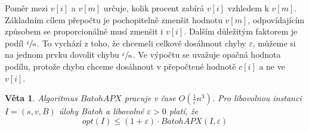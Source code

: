 \documentclass[11pt]{report} %
\newtheorem{theorem}{Věta}[section]
\numberwithin{equation}{section}
\begin{document}
Poměr mezi $v[i]$ a $v[m]$ určuje, kolik procent zabírá $v[i]$ vzhledem k $v[m]$. Základním cílem přepočtu je pochopitelně zmenšit hodnotu $v[m]$, odpovídajícím způsobem se proporcionálně musí zmenšit i $v[i]$. Dalším důležitým faktorem je podíl $\sfrac{\varepsilon}{n}$. To vychází z toho, že chcemeli celkově dosáhnout chyby $\varepsilon$, můžeme si na jednom prvku dovolit chybu $\sfrac{\varepsilon}{n}$. Ve výpočtu se uvažuje opačná hodnota podílu, protože chybu chceme dosáhnout v přepočtené hodnotě $c[i]$ a ne ve $v[i]$.

\begin{theorem}
Algoritmus $BatohAPX$ pracuje v čase $O(\frac{1}{\varepsilon}n^3)$. Pro libovolnou instanci $I = (s, v, B)$ úlohy Batoh a libovolné $\varepsilon > 0$ platí, že 
$$opt(I) \leq (1 + \varepsilon)\cdot BatohAPX(I, \varepsilon)$$
\end{theorem}
\end{document}
